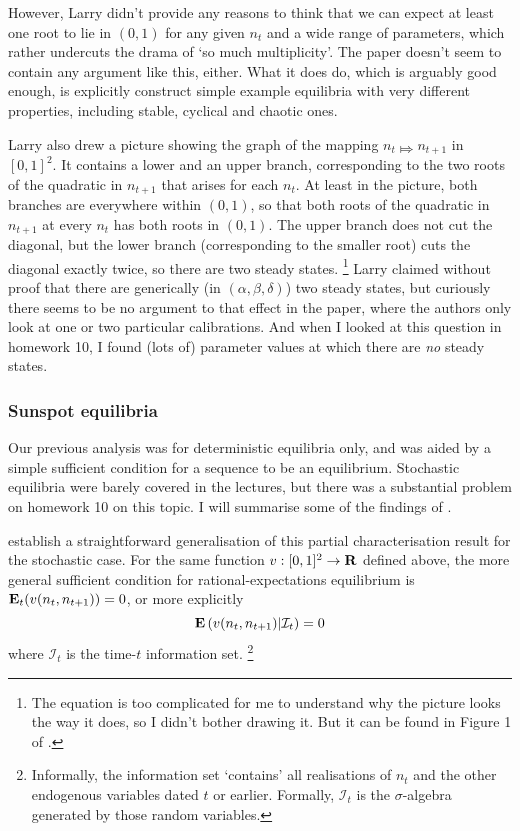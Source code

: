 \documentclass[11pt,letterpaper,reqno,oneside]{article}
\begin{document}
However, Larry didn't provide any reasons to think that we can expect at least one root to lie in $(0,1)$ for any given $n_t$ and a wide range of parameters, which rather undercuts the drama of `so much multiplicity'. The paper doesn't seem to contain any argument like this, either. What it does do, which is arguably good enough, is explicitly construct simple example equilibria with very different properties, including stable, cyclical and chaotic ones.

Larry also drew a picture showing the graph of the mapping $n_t \Mapsto n_{t+1}$ in $[0,1]^2$. It contains a lower and an upper branch, corresponding to the two roots of the quadratic in $n_{t+1}$ that arises for each $n_t$. At least in the picture, both branches are everywhere within $(0,1)$, so that both roots of the quadratic in $n_{t+1}$ at every $n_t$ has both roots in $(0,1)$. The upper branch does not cut the diagonal, but the lower branch (corresponding to the smaller root) cuts the diagonal exactly twice, so there are two steady states.%
	\footnote{The equation is too complicated for me to understand why the picture looks the way it does, so I didn't bother drawing it. But it can be found in Figure 1 of \textcite{ChristianoHarrison1999}.}
Larry claimed without proof that there are generically (in $(\alpha,\beta,\delta)$) two steady states, but curiously there seems to be no argument to that effect in the paper, where the authors only look at one or two particular calibrations. And when I looked at this question in homework 10, I found (lots of) parameter values at which there are \emph{no} steady states.



\subsubsection{Sunspot equilibria}
\label{sec:25Nov2015:sunspots_ChristianoHarrison1999:stochastic_equilibria}

Our previous analysis was for deterministic equilibria only, and was aided by a simple sufficient condition for a sequence to be an equilibrium. Stochastic equilibria were barely covered in the lectures, but there was a substantial problem on homework 10 on this topic. I will summarise some of the findings of \textcite{ChristianoHarrison1999}.


\textcite{ChristianoHarrison1999} establish a straightforward generalisation of this partial characterisation result for the stochastic case. For the same function $v : [0,1]^2 \to \mathbf{R}$ defined above, the more general sufficient condition for rational-expectations equilibrium is $\mathbf{E}_t(v(n_t,n_{t+1}))=0$, or more explicitly
%
\begin{equation*}
	\mathbf{E} \left( v(n_t,n_{t+1}) | \mathcal{I}_t \right) = 0 
\end{equation*}
%
where $\mathcal{I}_t$ is the time-$t$ information set.%
	\footnote{Informally, the information set `contains' all realisations of $n_t$ and the other endogenous variables dated $t$ or earlier. Formally, $\mathcal{I}_t$ is the $\sigma$-algebra generated by those random variables.}
\end{document}
